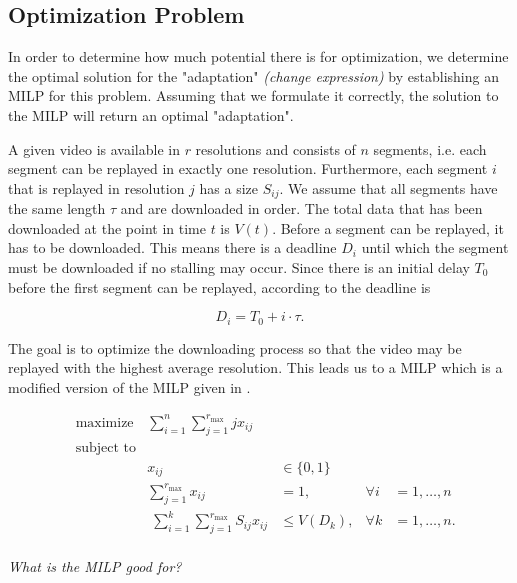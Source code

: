 \subsection{Optimization Problem}

In order to determine how much potential there is for optimization, we determine the optimal solution for the "adaptation" \textit{(change expression)} by establishing an MILP for this problem. Assuming that we formulate it correctly, the solution to the MILP will return an optimal "adaptation".

A given video is available in $r$ resolutions and consists of $n$ segments, i.e. each segment can be replayed in exactly one resolution. Furthermore, each segment $i$ that is replayed in resolution $j$ has a size $S_{ij}$. We assume that all segments have the same length $\tau$ and are downloaded in order. The total data that has been downloaded at the point in time $t$ is $V(t)$. Before a segment can be replayed, it has to be downloaded. This means there is a deadline $D_i$ until which the segment must be downloaded if no stalling may occur. Since there is an initial delay $T_0$ before the first segment can be replayed, according to \cite{hossfeld2015identifying} the deadline is

\begin{equation}
D_i = T_0 + i\cdot \tau.
\end{equation}

The goal is to optimize the downloading process so that the video may be replayed with the highest average resolution. This leads us to a MILP which is a modified version of the MILP given in \cite{hossfeld2015identifying}.

\begin{align*}
& \text{maximize} & \sum_{i = 1}^{n} \sum_{j = 1}^{r_{\text{max}}} j x_{ij} &\\
& \text{subject to} & &&\\
&& x_{ij} &\in \{0,1\} &\\
&& \sum_{j = 1}^{r_{\text{max}}} x_{ij} &= 1, &\forall i&=1,\ldots,n \\
&& \phantom{\text{.}} \sum_{i=1}^{k} \sum_{j = 1}^{r_{\text{max}}} S_{ij} x_{ij} &\leq V(D_k), &\forall k&=1,\ldots,n \text{.} \\
\end{align*}

\textit{What is the MILP good for?}